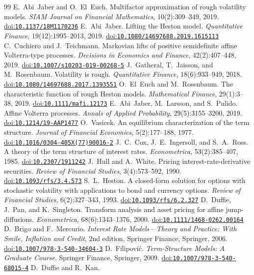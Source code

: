 \documentclass[11pt]{article}
\newcommand{\doi}[1]{\href{https://doi.org/#1}{doi:\nolinkurl{#1}}}
\begin{document}
\clearpage
\begin{thebibliography}{99}
\small
{} E.~Abi~Jaber and O.~El~Euch.
  Multifactor approximation of rough volatility models.
  \emph{SIAM Journal on Financial Mathematics}, 10(2):309--349, 2019. \doi{10.1137/18M1170236}
 E.~Abi~Jaber.
  Lifting the Heston model.
  \emph{Quantitative Finance}, 19(12):1995--2013, 2019. \doi{10.1080/14697688.2019.1615113}
 C.~Cuchiero and J.~Teichmann.
  Markovian lifts of positive semidefinite affine Volterra-type processes.
  \emph{Decisions in Economics and Finance}, 42(2):407--448, 2019. \doi{10.1007/s10203-019-00268-5}
 J.~Gatheral, T.~Jaisson, and M.~Rosenbaum.
  Volatility is rough.
  \emph{Quantitative Finance}, 18(6):933--949, 2018. \doi{10.1080/14697688.2017.1393551}
 O.~El~Euch and M.~Rosenbaum.
  The characteristic function of rough Heston models.
  \emph{Mathematical Finance}, 29(1):3--38, 2019. \doi{10.1111/mafi.12173}
 E.~Abi~Jaber, M.~Larsson, and S.~Pulido.
  Affine Volterra processes.
  \emph{Annals of Applied Probability}, 29(5):3155--3200, 2019. \doi{10.1214/19-AAP1477}
 O.~Vasicek.
  An equilibrium characterization of the term structure.
  \emph{Journal of Financial Economics}, 5(2):177--188, 1977. \doi{10.1016/0304-405X(77)90016-2}
 J.~C.~Cox, J.~E.~Ingersoll, and S.~A.~Ross.
  A theory of the term structure of interest rates.
  \emph{Econometrica}, 53(2):385--407, 1985. \doi{10.2307/1911242}
 J.~Hull and A.~White.
  Pricing interest-rate-derivative securities.
  \emph{Review of Financial Studies}, 3(4):573--592, 1990. \doi{10.1093/rfs/3.4.573}
 S.~L.~Heston.
  A closed-form solution for options with stochastic volatility with applications to bond and currency options.
  \emph{Review of Financial Studies}, 6(2):327--343, 1993. \doi{10.1093/rfs/6.2.327}
 D.~Duffie, J.~Pan, and K.~Singleton.
  Transform analysis and asset pricing for affine jump-diffusions.
  \emph{Econometrica}, 68(6):1343--1376, 2000. \doi{10.1111/1468-0262.00164}
 D.~Brigo and F.~Mercurio.
  \emph{Interest Rate Models---Theory and Practice: With Smile, Inflation and Credit}, 2nd edition.
  Springer Finance, Springer, 2006. \doi{10.1007/978-3-540-34604-3}
 D.~Filipovi\'{c}.
  \emph{Term-Structure Models: A Graduate Course}. Springer Finance, Springer, 2009.
  \doi{10.1007/978-3-540-68015-4}
 D.~Duffie and R.~Kan.

\end{thebibliography}
\end{document}
